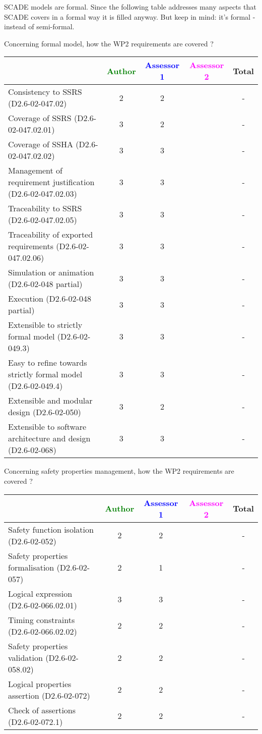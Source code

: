 \begin{author_comment}
SCADE models are formal. Since the following table addresses many aspects that SCADE covers in a formal way it is filled anyway. But keep in mind: it's formal - instead of semi-formal.  
\end{author_comment}


Concerning formal model, how the WP2 requirements are covered ?

\begin{tabular}{|l | c | c | c | c|}
\hline
& \textcolor{green}{Author} & \textcolor{blue}{Assessor 1} & \textcolor{magenta}{Assessor 2} & Total \\
\hline 
Consistency to SSRS (D2.6-02-047.02) & 2 & 2 & & - \\
\hline
Coverage of SSRS (D2.6-02-047.02.01)  & 3 & 2 & & - \\
\hline
Coverage of SSHA (D2.6-02-047.02.02)  &  3& 3 & & - \\
\hline
Management of requirement justification (D2.6-02-047.02.03)  &
3& 3 & & - \\
\hline
Traceability to  SSRS (D2.6-02-047.02.05)  &  3& 3 & & - \\
\hline
Traceability of exported requirements (D2.6-02-047.02.06)  &
3& 3 & & - \\
\hline
Simulation or animation (D2.6-02-048 partial)  &  3&
3& & - \\
\hline
Execution (D2.6-02-048 partial)  & 3 & 3 & & - \\
\hline
Extensible to strictly formal model (D2.6-02-049.3) &
3  & 3 & & - \\
\hline
Easy to  refine towards strictly formal model (D2.6-02-049.4) &
3 & 3 & & - \\
\hline
Extensible and modular design (D2.6-02-050)  & 3 & 2 & & - \\
\hline
Extensible to software architecture and design (D2.6-02-068)   &
3& 3 & & - \\
\hline
\end{tabular}

Concerning safety properties management, how the WP2 requirements are covered ?

\begin{tabular}{|l | c | c | c | c|}
\hline
& \textcolor{green}{Author} & \textcolor{blue}{Assessor 1} & \textcolor{magenta}{Assessor 2} & Total \\
\hline 
Safety function isolation (D2.6-02-052)  &  2& 2 & & - \\
\hline 
Safety properties formalisation (D2.6-02-057)  &  2&
1 & & - \\
\hline
Logical expression (D2.6-02-066.02.01)  &  3& 3 & & - \\
\hline
Timing constraints (D2.6-02-066.02.02)  &  2 & 2 & & - \\
\hline
Safety properties validation (D2.6-02-058.02)  &  2& 2 & & - \\
\hline
Logical properties assertion (D2.6-02-072)  &  2& 2 & & - \\
\hline
Check  of assertions (D2.6-02-072.1)  &  2& 2 & & - \\
\hline
\end{tabular}

